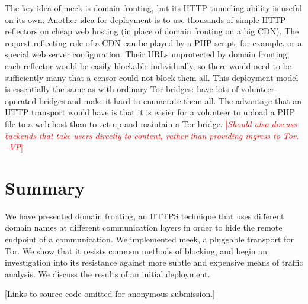 \documentclass{sig-alternate}
\newcommand{\meek}{meek\xspace}
\newcommand{\note}[1]{{\textcolor{red}{[\textit{#1}]}}}
\newcommand{\vp}[1]{\note{#1 --VP}}
\begin{document}

The key idea of \meek is domain fronting,
but its HTTP tunneling ability is useful on its own.
Another idea for deployment is to use
thousands of simple HTTP reflectors on cheap web hosting
(in place of domain fronting on a big CDN).
The request-reflecting role of a CDN can
be played by a PHP script, for example,
or a special web server configuration.
Their URLs unprotected by domain fronting,
each reflector would be easily blockable individually,
so there would need to be sufficiently many that
a censor could not block them all.
This deployment model is essentially the same as with
ordinary Tor bridges: have lots of volunteer-operated bridges
and make it hard to enumerate them all.
The advantage that an HTTP transport would have
is that it is easier for a volunteer to upload a PHP file to a web host
than to set up and maintain a Tor bridge.
\vp{Should also discuss backends that take users directly to content,
rather than providing ingress to Tor.}


\section{Summary}
\label{sec:summary}

We have presented domain fronting,
an HTTPS technique that uses different domain names
at different communication layers in
order to hide the remote endpoint of a communication.
We implemented \meek,
a pluggable transport for Tor.
We show that it resists common methods of blocking,
and begin an investigation into its
resistance against more subtle and expensive means of traffic analysis.
We discuss the results of an initial deployment.

[Links to source code omitted for anonymous submission.]
\end{document}
